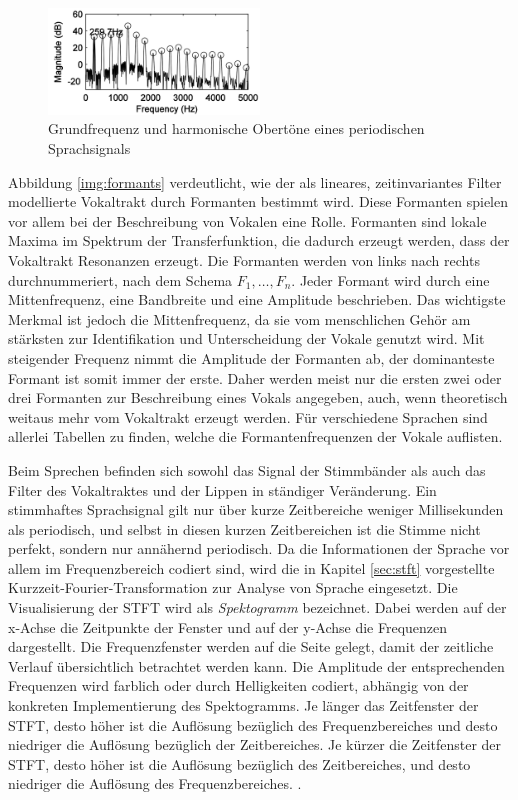 \begin{figure}[h]
	\centering
	\includegraphics[width=0.5\textwidth]{bilder/pitchPeaks.png}
	\caption{Grundfrequenz und harmonische Obertöne eines periodischen Sprachsignals}
	\label{img:pitchPeaks}
\end{figure}	

Abbildung \ref{img:formants} verdeutlicht, wie der als lineares, zeitinvariantes Filter modellierte Vokaltrakt durch Formanten bestimmt wird. Diese Formanten spielen vor allem bei der Beschreibung von Vokalen eine Rolle. Formanten sind lokale Maxima im Spektrum der Transferfunktion, die dadurch erzeugt werden, dass der Vokaltrakt Resonanzen erzeugt. Die Formanten werden von links nach rechts durchnummeriert, nach dem Schema $F_1 , \ldots , F_n$. Jeder Formant wird durch eine Mittenfrequenz, eine Bandbreite und eine Amplitude beschrieben. Das wichtigste Merkmal ist jedoch die Mittenfrequenz, da sie vom menschlichen Gehör am stärksten zur Identifikation und Unterscheidung der Vokale genutzt wird. Mit steigender Frequenz nimmt die Amplitude der Formanten ab, der dominanteste Formant ist somit immer der erste. Daher werden meist nur die ersten zwei oder drei Formanten zur Beschreibung eines Vokals angegeben, auch, wenn theoretisch weitaus mehr vom Vokaltrakt erzeugt werden. Für verschiedene Sprachen sind allerlei Tabellen zu finden, welche die Formantenfrequenzen der Vokale auflisten.\cite[S. 19]{sprachverarbeitung}

Beim Sprechen befinden sich sowohl das Signal der Stimmbänder als auch das Filter des Vokaltraktes und der Lippen in ständiger Veränderung. Ein stimmhaftes Sprachsignal gilt nur über kurze Zeitbereiche weniger Millisekunden als periodisch, und selbst in diesen kurzen Zeitbereichen ist die Stimme nicht perfekt, sondern nur annähernd periodisch. Da die Informationen der Sprache vor allem im Frequenzbereich codiert sind, wird die in Kapitel \ref{sec:stft} vorgestellte Kurzzeit-Fourier-Transformation zur Analyse von Sprache eingesetzt. Die Visualisierung der STFT wird als \emph{Spektogramm} bezeichnet. Dabei werden auf der x-Achse die Zeitpunkte der Fenster und auf der y-Achse die Frequenzen dargestellt. Die Frequenzfenster werden \glqq auf die Seite gelegt\grqq{}, damit der zeitliche Verlauf übersichtlich betrachtet werden kann. Die Amplitude der entsprechenden Frequenzen wird farblich oder durch Helligkeiten codiert, abhängig von der konkreten Implementierung des Spektogramms. Je länger das Zeitfenster der STFT, desto höher ist die Auflösung bezüglich des Frequenzbereiches und desto niedriger die Auflösung bezüglich der Zeitbereiches. Je kürzer die Zeitfenster der STFT, desto höher ist die Auflösung bezüglich des Zeitbereiches, und desto niedriger die Auflösung des Frequenzbereiches.\cite[S. 45 - 50]{sprachverarbeitung} \cite[\emph{Acoustic Representations of Speech}]{speechAcoustics}. 

